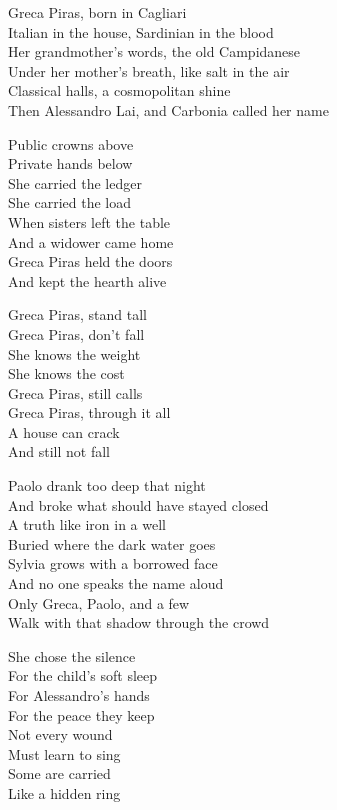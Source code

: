 \begin{lyrics}
Greca Piras, born in Cagliari\\
Italian in the house, Sardinian in the blood\\
Her grandmother’s words, the old Campidanese\\
Under her mother’s breath, like salt in the air\\
Classical halls, a cosmopolitan shine\\
Then Alessandro Lai, and Carbonia called her name

Public crowns above\\
Private hands below\\
She carried the ledger\\
She carried the load\\
When sisters left the table\\
And a widower came home\\
Greca Piras held the doors\\
And kept the hearth alive

Greca Piras, stand tall\\
Greca Piras, don’t fall\\
She knows the weight\\
She knows the cost\\
Greca Piras, still calls\\
Greca Piras, through it all\\
A house can crack\\
And still not fall

Paolo drank too deep that night\\
And broke what should have stayed closed\\
A truth like iron in a well\\
Buried where the dark water goes\\
Sylvia grows with a borrowed face\\
And no one speaks the name aloud\\
Only Greca, Paolo, and a few\\
Walk with that shadow through the crowd

She chose the silence\\
For the child’s soft sleep\\
For Alessandro’s hands\\
For the peace they keep\\
Not every wound\\
Must learn to sing\\
Some are carried\\
Like a hidden ring


\end{lyrics}

